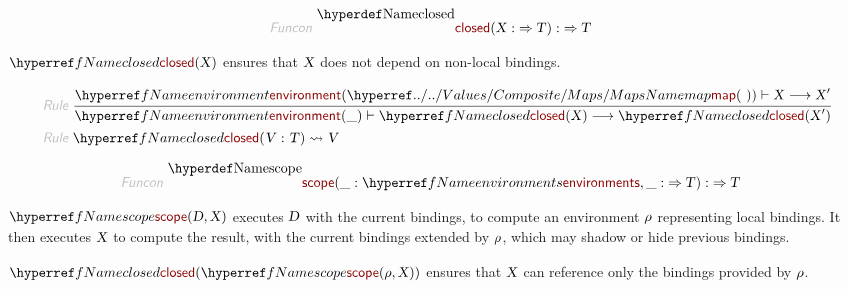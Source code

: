 \begin{displaymath}
\relax\begin{aligned}\relax
  \KEY{Funcon} ~ 
  & \NAMEDECL{closed}(\VAR{X} :  \TO \VAR{T}) :  \TO \VAR{T}
\end{aligned}
\end{displaymath}

$\SHADE{\NAMEREF{closed}
           (\VAR{X})}$ ensures that $\SHADE{\VAR{X}}$ does not depend on non-local bindings.

\begin{displaymath}
\relax\begin{aligned}\relax
  \KEY{Rule} ~ 
    & \RULE{
      \NAMEREF{environment} (\NAMEHYPER{../../Values/Composite}{Maps}{map}
                              ( ~ )) \vdash \VAR{X} \TRANS \VAR{X}'
      }{
      \NAMEREF{environment} (\_) \vdash \NAMEREF{closed}
                    (\VAR{X}) \TRANS \NAMEREF{closed}
                                                               (\VAR{X}')
      }
\\
  \KEY{Rule} ~ 
    & \NAMEREF{closed}
        (\VAR{V} : \VAR{T}) \leadsto \VAR{V}
\end{aligned}
\end{displaymath}

\begin{displaymath}
\relax\begin{aligned}\relax
  \KEY{Funcon} ~ 
  & \NAMEDECL{scope}(\_ : \NAMEREF{environments}, \_ :  \TO \VAR{T}) :  \TO \VAR{T}
\end{aligned}
\end{displaymath}

$\SHADE{\NAMEREF{scope}
           (\VAR{D},   
            \VAR{X})}$ executes $\SHADE{\VAR{D}}$ with the current bindings, to compute an environment
  $\SHADE{\VAR{$\rho$}}$ representing local bindings. It then executes $\SHADE{\VAR{X}}$ to compute the result,
  with the current bindings extended by $\SHADE{\VAR{$\rho$}}$, which may shadow or hide previous
  bindings.

$\SHADE{\NAMEREF{closed}
           (\NAMEREF{scope}
              (\VAR{$\rho$},    
               \VAR{X}))}$ ensures that $\SHADE{\VAR{X}}$ can reference only the bindings
  provided by $\SHADE{\VAR{$\rho$}}$.

